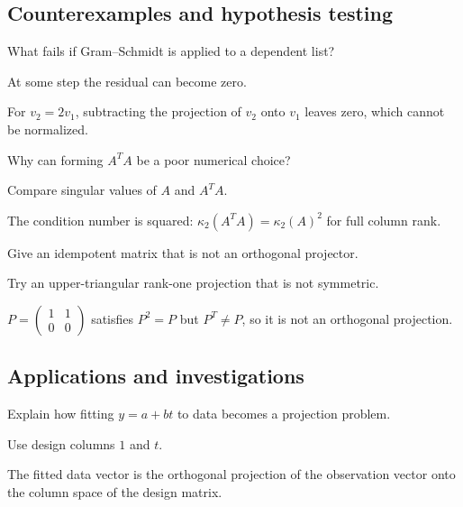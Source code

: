 \subsection*{Counterexamples and hypothesis testing}

\begin{exercise}\label{exr:i14-expand-10}
What fails if Gram--Schmidt is applied to a dependent list?
\end{exercise}
\begin{hint}
At some step the residual can become zero.
\end{hint}
\begin{solution}
For \(v_2=2v_1\), subtracting the projection of \(v_2\) onto \(v_1\) leaves zero, which cannot be normalized.
\end{solution}

\begin{exercise}\label{exr:i14-expand-11}
Why can forming \(A^TA\) be a poor numerical choice?
\end{exercise}
\begin{hint}
Compare singular values of \(A\) and \(A^TA\).
\end{hint}
\begin{solution}
The condition number is squared: \(\kappa_2(A^TA)=\kappa_2(A)^2\) for full column rank.
\end{solution}

\begin{exercise}\label{exr:i14-expand-12}
Give an idempotent matrix that is not an orthogonal projector.
\end{exercise}
\begin{hint}
Try an upper-triangular rank-one projection that is not symmetric.
\end{hint}
\begin{solution}
\(P=\begin{pmatrix}1&1\\0&0\end{pmatrix}\) satisfies \(P^2=P\) but \(P^T\ne P\), so it is not an orthogonal projection.
\end{solution}

\subsection*{Applications and investigations}

\begin{exercise}\label{exr:i14-expand-13}
Explain how fitting \(y=a+bt\) to data becomes a projection problem.
\end{exercise}
\begin{hint}
Use design columns \(1\) and \(t\).
\end{hint}
\begin{solution}
The fitted data vector is the orthogonal projection of the observation vector onto the column space of the design matrix.
\end{solution}

